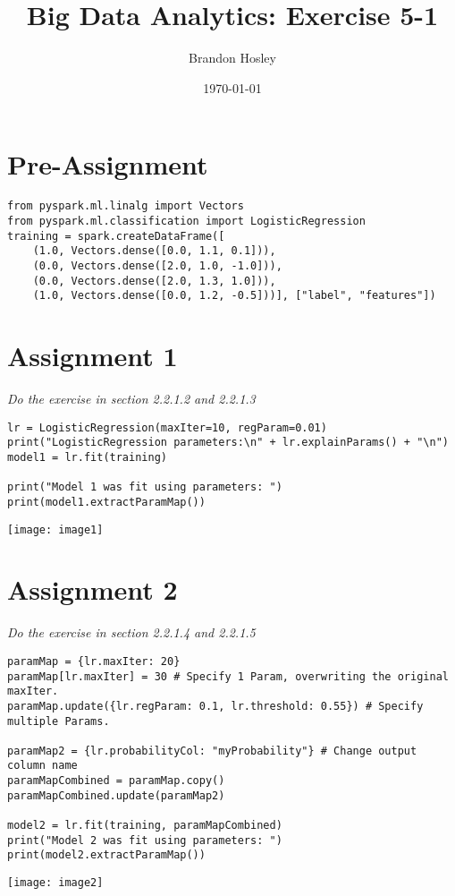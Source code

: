 \documentclass[]{article}
\title{Big Data Analytics: Exercise 5-1}
\author{Brandon Hosley}
\date{\today}
\begin{document}
\maketitle

\section*{Pre-Assignment}
\begin{verbatim}
from pyspark.ml.linalg import Vectors
from pyspark.ml.classification import LogisticRegression
training = spark.createDataFrame([
	(1.0, Vectors.dense([0.0, 1.1, 0.1])),
	(0.0, Vectors.dense([2.0, 1.0, -1.0])),
	(0.0, Vectors.dense([2.0, 1.3, 1.0])),
	(1.0, Vectors.dense([0.0, 1.2, -0.5]))], ["label", "features"])
\end{verbatim}

\section*{Assignment 1}
\emph{ Do the exercise in section 2.2.1.2 and 2.2.1.3 }

\begin{verbatim}
lr = LogisticRegression(maxIter=10, regParam=0.01)
print("LogisticRegression parameters:\n" + lr.explainParams() + "\n")
model1 = lr.fit(training)

print("Model 1 was fit using parameters: ")
print(model1.extractParamMap())
\end{verbatim}
\texttt{[image: image1]} %


\section*{Assignment 2}
\emph{ Do the exercise in section 2.2.1.4 and 2.2.1.5 }

\begin{verbatim}
paramMap = {lr.maxIter: 20}
paramMap[lr.maxIter] = 30 # Specify 1 Param, overwriting the original maxIter.
paramMap.update({lr.regParam: 0.1, lr.threshold: 0.55}) # Specify multiple Params.

paramMap2 = {lr.probabilityCol: "myProbability"} # Change output column name
paramMapCombined = paramMap.copy()
paramMapCombined.update(paramMap2)

model2 = lr.fit(training, paramMapCombined)
print("Model 2 was fit using parameters: ")
print(model2.extractParamMap())
\end{verbatim}
\texttt{[image: image2]} %
\end{document}
